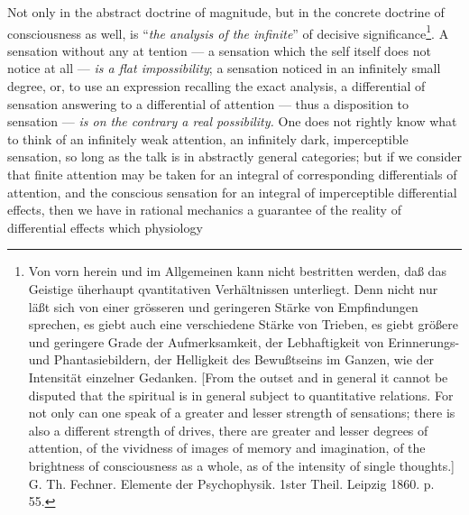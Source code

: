 \documentclass[12pt,a4paper]{book}
\begin{document}
Not only in the abstract doctrine of magnitude, but in the concrete doctrine of
consciousness as well, is ``\emph{the analysis of the infinite}'' of decisive
significance\footnote{Von vorn herein und im Allgemeinen kann nicht bestritten werden,
daß das Geistige üherhaupt qvantitativen Verhältnissen unterliegt. Denn nicht nur läßt
sich von einer grösseren und geringeren Stärke von Empfindungen sprechen, es giebt
auch eine verschiedene Stärke von Trieben, es giebt größere und geringere Grade der
Aufmerksamkeit, der Lebhaftigkeit von Erinnerungs- und Phantasiebildern, der
Helligkeit des Bewußtseins im Ganzen, wie der Intensität einzelner Gedanken. [From the
outset and in general it cannot be disputed that the spiritual is in general subject
to quantitative relations. For not only can one speak of a greater and lesser strength
of sensations; there is also a different strength of drives, there are greater and
lesser degrees of attention, of the vividness of images of memory and imagination, of
the brightness of consciousness as a whole, as of the intensity of single thoughts.]
G. Th. Fechner. Elemente der Psychophysik. 1ster Theil. Leipzig 1860. p. 55.}. A
sensation without any at%
\setcounter{footnote}{0}%
tention --- a sensation which the self itself does not notice at all --- \emph{is a
flat impossibility}; a sensation noticed in an infinitely small degree, or, to use an
expression recalling the exact analysis, a differential of sensation answering to a
differential of attention --- thus a disposition to sensation --- \emph{is on the
contrary a real possibility.} One does not rightly know what to think of an infinitely
weak attention, an infinitely dark, imperceptible sensation, so long as the talk is in
abstractly general categories; but if we consider that finite attention may be taken
for an integral of corresponding differentials of attention, and the conscious
sensation for an integral of imperceptible differential effects, then we have in
rational mechanics a guarantee of the reality of differential effects which physiology
\end{document}
